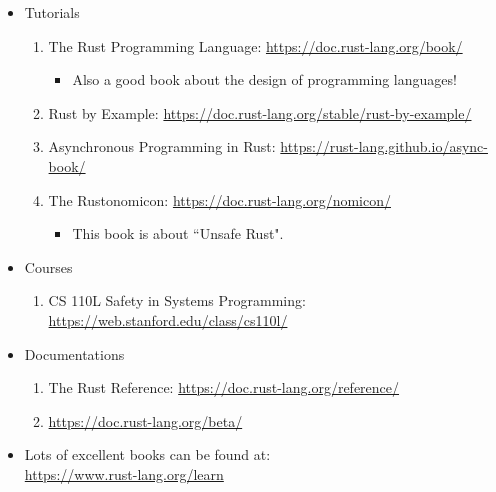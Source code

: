\documentclass{article}
\begin{document}
\begin{itemize}
    \begin{itemize}
        \item Tutorials
        \begin{enumerate}
            \item The Rust Programming Language:
            \href{https://doc.rust-lang.org/book/}{https://doc.rust-lang.org/book/}
            \begin{itemize}
                \item Also a good book about the design of programming languages!
            \end{itemize}
            \item Rust by Example:
            \href{https://doc.rust-lang.org/stable/rust-by-example/}{https://doc.rust-lang.org/stable/rust-by-example/}
            \item Asynchronous Programming in Rust:
            \href{https://rust-lang.github.io/async-book/}{https://rust-lang.github.io/async-book/}
            \item The Rustonomicon:
            \href{https://doc.rust-lang.org/nomicon/}{https://doc.rust-lang.org/nomicon/}
            \begin{itemize}
                \item This book is about ``Unsafe Rust".
            \end{itemize}
        \end{enumerate}
        \item Courses
        \begin{enumerate}
            \item CS 110L Safety in Systems Programming:\\
            \href{https://web.stanford.edu/class/cs110l/}{https://web.stanford.edu/class/cs110l/}
        \end{enumerate}
        \item Documentations
        \begin{enumerate}
            \item The Rust Reference:
            \href{https://doc.rust-lang.org/reference/}{https://doc.rust-lang.org/reference/}
            \item \href{https://doc.rust-lang.org/beta/}{https://doc.rust-lang.org/beta/}
        \end{enumerate}
        \item Lots of excellent books can be found at:\\
        \href{https://www.rust-lang.org/learn}{https://www.rust-lang.org/learn}

\end{itemize}
\end{itemize}
\end{document}
